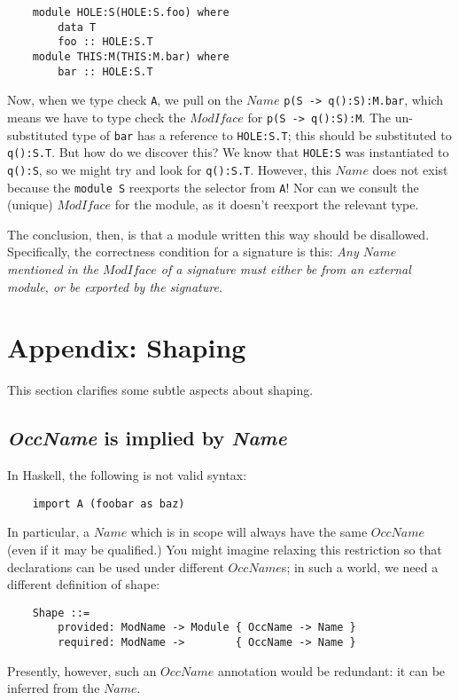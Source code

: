 \documentclass{article}
\newcommand{\I}[1]{\ensuremath{\mathit{#1}}}
\begin{document}
\begin{verbatim}
    module HOLE:S(HOLE:S.foo) where
        data T
        foo :: HOLE:S.T
    module THIS:M(THIS:M.bar) where
        bar :: HOLE:S.T
\end{verbatim}
%
Now, when we type check \verb|A|, we pull on the \I{Name} \verb|p(S -> q():S):M.bar|,
which means we have to type check the \I{ModIface} for \verb|p(S -> q():S):M|.
The un-substituted type of \verb|bar| has a reference to \verb|HOLE:S.T|;
this should be substituted to \verb|q():S.T|.  But how do we discover this?
We know that \verb|HOLE:S| was instantiated to \verb|q():S|, so we might try
and look for \verb|q():S.T|.  However, this \I{Name} does not exist because
the \verb|module S| reexports the selector from \verb|A|!  Nor can we consult
the (unique) \I{ModIface} for the module, as it doesn't reexport the relevant
type.

The conclusion, then, is that a module written this way should be disallowed.
Specifically, the correctness condition for a signature is this: \emph{Any \I{Name}
mentioned in the \I{ModIface} of a signature must either be from an external module, or be
exported by the signature}.

\section{Appendix: Shaping}

This section clarifies some subtle aspects about shaping.

\subsection{\textit{OccName} is implied by \textit{Name}}
In Haskell, the following is not valid syntax:

\begin{verbatim}
    import A (foobar as baz)
\end{verbatim}
In particular, a \I{Name} which is in scope will always have the same
\I{OccName} (even if it may be qualified.)  You might imagine relaxing
this restriction so that declarations can be used under different \I{OccName}s;
in such a world, we need a different definition of shape:

\begin{verbatim}
    Shape ::=
        provided: ModName -> Module { OccName -> Name }
        required: ModName ->        { OccName -> Name }
\end{verbatim}
Presently, however, such an \I{OccName} annotation would be redundant: it can be inferred from the \I{Name}.
\end{document}
